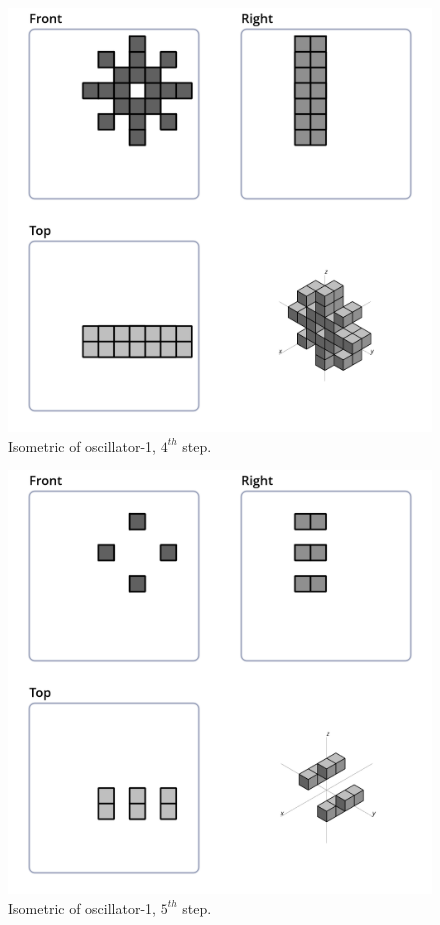\begin{figure}[H]
  \centering
  \includegraphics[scale=0.532]{iso_settings/osc_1_4.png}
  \caption{Isometric of oscillator-1, $4^{th}$ step.}
  \label{fig:iso-osc-1-4}
\end{figure}

\begin{figure}[H]
  \centering
  \includegraphics[scale=0.532]{iso_settings/osc_1_5.png}
  \caption{Isometric of oscillator-1, $5^{th}$ step.}
  \label{fig:iso-osc-1-5}
\end{figure}



